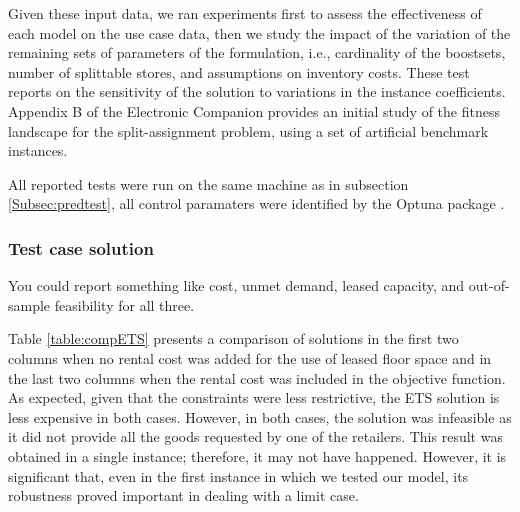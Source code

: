 \documentclass[mnsc,sglanonrev]{informs4}  %
\theoremstyle{remark}\newtheorem{remark}{Remark}
\begin{document}
Given these input data, we ran experiments first to assess the effectiveness of each model on the use case data, then we study the impact of the variation of the remaining sets of parameters of the formulation, i.e., cardinality of the boostsets, number of splittable stores, and assumptions on inventory costs. These test reports on the sensitivity of the solution to variations in the instance coefficients. Appendix B of the Electronic Companion provides an initial study of the fitness landscape for the split-assignment problem, using a set of artificial benchmark instances.

All reported tests were run on the same machine as in subsection \ref{Subsec:predtest}, all control paramaters were identified by the Optuna package \citep{optuna19}.

\subsubsection*{Test case solution}

You could report something like cost, unmet demand, leased capacity, and out-of-sample feasibility for all three. 


Table \ref{table:compETS} presents a comparison of solutions in the first two columns when no rental cost was added for the use of leased floor space and in the last two columns when the rental cost was included in the objective function. As expected, given that the constraints were less restrictive, the ETS solution is less expensive in both cases. However, in both cases, the solution was infeasible as it did not provide all the goods requested by one of the retailers. This result was obtained in a single instance; therefore, it may not have happened. However, it is significant that, even in the first instance in which we tested our model, its robustness proved important in dealing with a limit case.
\end{document}

